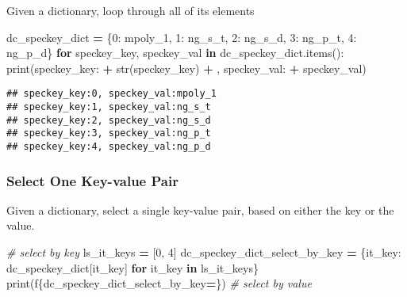 \documentclass[
]{book}
\newenvironment{Shaded}{\begin{snugshade}}{\end{snugshade}}
\newcommand{\BuiltInTok}[1]{#1}
\newcommand{\CommentTok}[1]{\textcolor[rgb]{0.56,0.35,0.01}{\textit{#1}}}
\newcommand{\ControlFlowTok}[1]{\textcolor[rgb]{0.13,0.29,0.53}{\textbf{#1}}}
\newcommand{\DecValTok}[1]{\textcolor[rgb]{0.00,0.00,0.81}{#1}}
\newcommand{\KeywordTok}[1]{\textcolor[rgb]{0.13,0.29,0.53}{\textbf{#1}}}
\newcommand{\NormalTok}[1]{#1}
\newcommand{\OperatorTok}[1]{\textcolor[rgb]{0.81,0.36,0.00}{\textbf{#1}}}
\newcommand{\SpecialCharTok}[1]{\textcolor[rgb]{0.00,0.00,0.00}{#1}}
\newcommand{\SpecialStringTok}[1]{\textcolor[rgb]{0.31,0.60,0.02}{#1}}
\newcommand{\StringTok}[1]{\textcolor[rgb]{0.31,0.60,0.02}{#1}}
\begin{document}
Given a dictionary, loop through all of its elements

\begin{Shaded}
\begin{Highlighting}[]
\NormalTok{dc\_speckey\_dict }\OperatorTok{=}\NormalTok{ \{}\DecValTok{0}\NormalTok{: }\StringTok{\textquotesingle{}mpoly\_1\textquotesingle{}}\NormalTok{,}
                   \DecValTok{1}\NormalTok{: }\StringTok{\textquotesingle{}ng\_s\_t\textquotesingle{}}\NormalTok{,}
                   \DecValTok{2}\NormalTok{: }\StringTok{\textquotesingle{}ng\_s\_d\textquotesingle{}}\NormalTok{,}
                   \DecValTok{3}\NormalTok{: }\StringTok{\textquotesingle{}ng\_p\_t\textquotesingle{}}\NormalTok{,}
                   \DecValTok{4}\NormalTok{: }\StringTok{\textquotesingle{}ng\_p\_d\textquotesingle{}}\NormalTok{\}}
\ControlFlowTok{for}\NormalTok{ speckey\_key, speckey\_val }\KeywordTok{in}\NormalTok{ dc\_speckey\_dict.items():}
    \BuiltInTok{print}\NormalTok{(}\StringTok{\textquotesingle{}speckey\_key:\textquotesingle{}} \OperatorTok{+} \BuiltInTok{str}\NormalTok{(speckey\_key) }\OperatorTok{+} \StringTok{\textquotesingle{}, speckey\_val:\textquotesingle{}} \OperatorTok{+}\NormalTok{ speckey\_val)}
\end{Highlighting}
\end{Shaded}

\begin{verbatim}
## speckey_key:0, speckey_val:mpoly_1
## speckey_key:1, speckey_val:ng_s_t
## speckey_key:2, speckey_val:ng_s_d
## speckey_key:3, speckey_val:ng_p_t
## speckey_key:4, speckey_val:ng_p_d
\end{verbatim}

\hypertarget{select-one-key-value-pair}{%
\subsubsection{Select One Key-value Pair}\label{select-one-key-value-pair}}

Given a dictionary, select a single key-value pair, based on either the key or the value.

\begin{Shaded}
\begin{Highlighting}[]
\CommentTok{\# select by key}
\NormalTok{ls\_it\_keys }\OperatorTok{=}\NormalTok{ [}\DecValTok{0}\NormalTok{, }\DecValTok{4}\NormalTok{]}
\NormalTok{dc\_speckey\_dict\_select\_by\_key }\OperatorTok{=}\NormalTok{ \{it\_key: dc\_speckey\_dict[it\_key] }\ControlFlowTok{for}\NormalTok{ it\_key }\KeywordTok{in}\NormalTok{ ls\_it\_keys\}}
\BuiltInTok{print}\NormalTok{(}\SpecialStringTok{f\textquotesingle{}}\SpecialCharTok{\{}\NormalTok{dc\_speckey\_dict\_select\_by\_key}\OperatorTok{=}\SpecialCharTok{\}}\SpecialStringTok{\textquotesingle{}}\NormalTok{)}
\CommentTok{\# select by value}
\end{Highlighting}
\end{Shaded}
\end{document}
